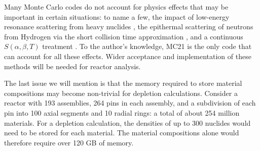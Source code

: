 Many Monte Carlo codes do not account for physics effects that may be important
in certain situations: to name a few, the impact of low-energy resonance
scattering from heavy nuclides \cite{ane-becker-2009, physor-sunny-2012}, the
epithermal scattering of neutrons from Hydrogen via the short collision time
approximation \cite{mc-sutton-2009}, and a continuous $S(\alpha,\beta,T)$
treatment \cite{physor-pavlou-2012}. To the author's knowledge, MC21 is the only
code that can account for all these effects. Wider acceptance and implementation
of these methods will be needed for reactor analysis.

The last issue we will mention is that the memory required to store material
compositions may become non-trivial for depletion calculations. Consider a
reactor with 193 assemblies, 264 pins in each assembly, and a subdivision of
each pin into 100 axial segments and 10 radial rings: a total of about 254
million materials. For a depletion calculation, the densities of up to 300
nuclides would need to be stored for each material. The material compositions
alone would therefore require over 120 GB of memory.
